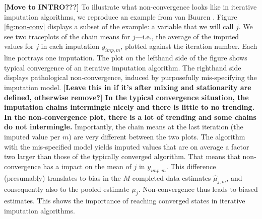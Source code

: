 \documentclass[Royal,times,sageh]{sagej}
\begin{document}
\textbf{{[}Move to INTRO???{]}} To illustrate what non-convergence looks like in iterative imputation algorithms, we reproduce an example from van Buuren \citeyearpar[\(\S\) 6.5.2]{buur18}. Figure \ref{fig:non-conv} displays a subset of the example: a variable that we will call \(j\). We see two traceplots of the chain means for \(j\)---i.e., the average of the imputed values for \(j\) in each imputation \(y_{imp,m}\), plotted against the iteration number. Each line portrays one imputation. The plot on the lefthand side of the figure shows typical convergence of an iterative imputation algorithm. The righthand side displays pathological non-convergence, induced by purposefully mis-specifying the imputation model. \textbf{{[}Leave this in if it's after mixing and stationarity are defined, otherwise remove?{]} In the typical convergence situation, the imputation chains intermingle nicely and there is little to no trending. In the non-convergence plot, there is a lot of trending and some chains do not intermingle.} Importantly, the chain means at the last iteration (the imputed value per \(m\)) are very different between the two plots. The algorithm with the mis-specified model yields imputed values that are on average a factor two larger than those of the typically converged algorithm. That means that non-convergence has a impact on the mean of \(j\) in \(y_{imp, m}\). This difference (presumably) translates to bias in the \(M\) completed data estimates \(\hat{\mu}_{j,m}\), and consequently also to the pooled estimate \(\bar{\mu}_j\). Non-convergence thus leads to biased estimates. This shows the importance of reaching converged states in iterative imputation algorithms.
\end{document}
